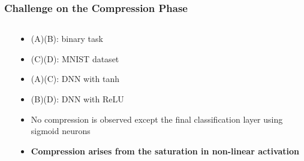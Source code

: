 \documentclass{beamer}
\begin{document}
\begin{frame}
    \frametitle{Challenge on the Compression Phase}
    \begin{columns}
        \begin{column}{0.6\textwidth}
        \end{column}
        \begin{column}{0.4\textwidth}
            \begin{itemize}
                \item (A)(B): binary task
                \item (C)(D): MNIST dataset
                \item (A)(C): DNN with tanh
                \item (B)(D): DNN with ReLU
                \item No compression is observed except the final classification layer using sigmoid neurons
                \item \textbf{Compression arises from the saturation in non-linear activation}
            \end{itemize}
        \end{column}
    \end{columns}
\end{frame}
\end{document}

